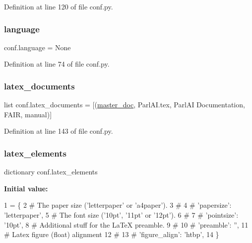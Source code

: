 Definition at line 120 of file conf.\+py.

\mbox{\label{namespaceconf_ad76a2e6d7bfa880ebb4042c08e8b4e12}} 
\subsubsection{\texorpdfstring{language}{language}}
{\footnotesize\ttfamily conf.\+language = None}



Definition at line 74 of file conf.\+py.

\mbox{\label{namespaceconf_a7812f49970f3de0d15dd7b9b9a10e3a1}} 
\subsubsection{\texorpdfstring{latex\+\_\+documents}{latex\_documents}}
{\footnotesize\ttfamily list conf.\+latex\+\_\+documents = \mbox{[}(\hyperlink{namespaceconf_a6fcd7e5236f355b1e1a55f9d95988810}{master\+\_\+doc}, \textquotesingle{}Parl\+A\+I.\+tex\textquotesingle{}, \textquotesingle{}Parl\+AI Documentation\textquotesingle{}, \textquotesingle{}F\+A\+IR\textquotesingle{}, \textquotesingle{}manual\textquotesingle{})\mbox{]}}



Definition at line 143 of file conf.\+py.

\mbox{\label{namespaceconf_a33619d385ad23765ac6ebb58bf82d43d}} 
\subsubsection{\texorpdfstring{latex\+\_\+elements}{latex\_elements}}
{\footnotesize\ttfamily dictionary conf.\+latex\+\_\+elements}

{\bfseries Initial value\+:}
\begin{DoxyCode}
1 =  \{
2     \textcolor{comment}{# The paper size ('letterpaper' or 'a4paper').}
3     \textcolor{comment}{#}
4     \textcolor{comment}{# 'papersize': 'letterpaper',}
5     \textcolor{comment}{# The font size ('10pt', '11pt' or '12pt').}
6     \textcolor{comment}{#}
7     \textcolor{comment}{# 'pointsize': '10pt',}
8     \textcolor{comment}{# Additional stuff for the LaTeX preamble.}
9     \textcolor{comment}{#}
10     \textcolor{comment}{# 'preamble': '',}
11     \textcolor{comment}{# Latex figure (float) alignment}
12     \textcolor{comment}{#}
13     \textcolor{comment}{# 'figure\_align': 'htbp',}
14 \}
\end{DoxyCode}


